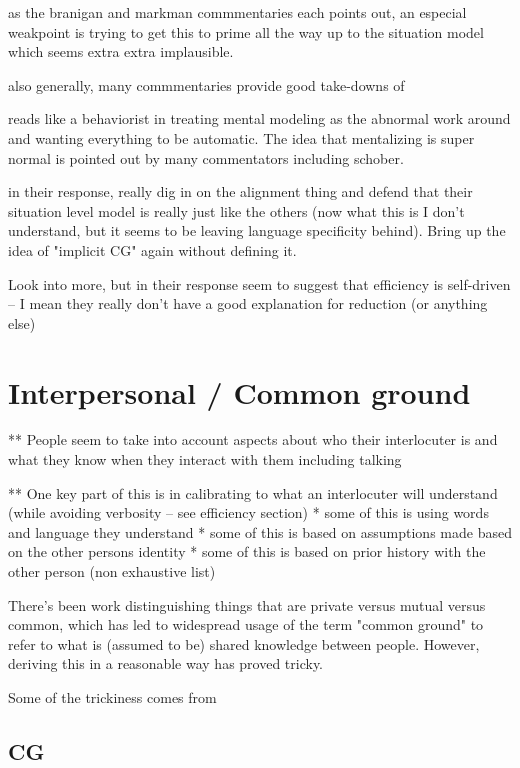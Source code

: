 \documentclass[]{article}
\begin{document}
\cite{pickering} as the branigan and markman commmentaries each points out, an especial weakpoint is trying to get this to prime all the way up to the situation model which seems extra extra implausible. 

also generally, many commmentaries provide good take-downs of \cite{pickering2004}

\cite{pickering2004} reads like a behaviorist in treating mental modeling as the abnormal work around and wanting everything to be automatic. The idea that mentalizing is super normal is pointed out by many commentators including schober. 

in their response, \cite{pickering2004} really dig in on the alignment thing and defend that their situation level model is really just like the others (now what this is I don't understand, but it seems to be leaving language specificity behind). Bring up the idea of "implicit CG" again without defining it. 

Look into more, but \cite{pickering2004} in their response seem to suggest that efficiency is self-driven -- I mean they really don't have a good explanation for reduction (or anything else) 


\section{Interpersonal / Common ground}

** People seem to take into account aspects about who their interlocuter is and what they know when they interact with them including talking 

** One key part of this is in calibrating to what an interlocuter will understand (while avoiding verbosity -- see efficiency section)
 * some of this is using words and language they understand
 * some of this is based on assumptions made based on the other persons identity 
 * some of this is based on prior history with the other person
 (non exhaustive list) 
 
There's been work distinguishing things that are private versus mutual versus common, which has led to widespread usage of the term "common ground" to refer to what is (assumed to be) shared knowledge between people. However, deriving this in a reasonable way has proved tricky. 

Some of the trickiness comes from 
\subsection{CG}
\end{document}
